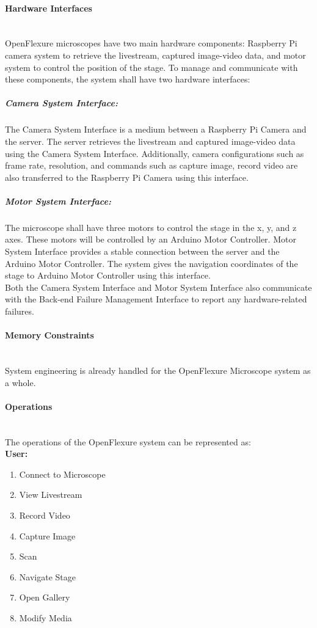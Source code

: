 \paragraph{Hardware Interfaces}\mbox{}\\
OpenFlexure microscopes have two main hardware components: Raspberry Pi camera system to retrieve the livestream, captured image-video data, and motor system to control the position of the stage. To manage and communicate with these components, the system shall have two hardware interfaces:
\subparagraph{Camera System Interface:} The Camera System Interface is a medium between a Raspberry Pi Camera and the server. The server retrieves the livestream and captured image-video data using the Camera System Interface. Additionally, camera configurations such as frame rate, resolution, and commands such as capture image, record video are also transferred to the Raspberry Pi Camera using this interface.
\subparagraph{Motor System Interface:} The microscope shall have three motors to control the stage in the x, y, and z axes. These motors will be controlled by an Arduino Motor Controller. Motor System Interface provides a stable connection between the server and the Arduino Motor Controller. The system gives the navigation coordinates of the stage to Arduino Motor Controller using this interface.\\

Both the Camera System Interface and Motor System Interface also communicate with the Back-end Failure Management Interface to report any hardware-related failures.

\paragraph{Memory Constraints}\mbox{}\\
System engineering is already handled for the OpenFlexure Microscope system as a whole.
\paragraph{Operations}\mbox{}\\
The operations of the OpenFlexure system can be represented as: \\
\textbf{User:}
\begin{enumerate}
	\item  Connect to Microscope
	\item  View Livestream
	\item  Record Video
	\item  Capture Image
	\item  Scan
	\item  Navigate Stage
	\item  Open Gallery
	\item  Modify Media
\end{enumerate}

